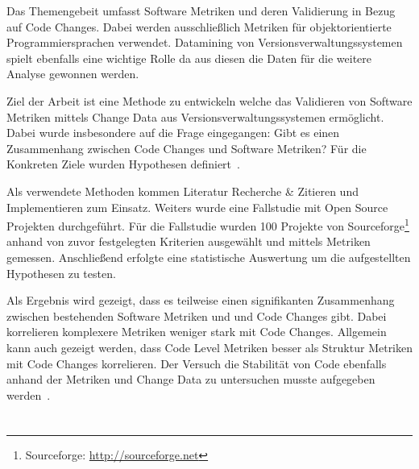 

 Das Themengebeit umfasst Software Metriken und deren
Validierung in Bezug auf Code Changes. Dabei werden ausschließlich Metriken
für objektorientierte Programmiersprachen verwendet. Datamining von
Versionsverwaltungssystemen spielt ebenfalls eine wichtige Rolle da aus diesen
die Daten für die weitere Analyse gewonnen werden.

 Ziel der Arbeit ist eine Methode zu entwickeln
welche das Validieren von Software Metriken mittels Change Data aus
Versionsverwaltungssystemen ermöglicht. Dabei wurde insbesondere auf die Frage
eingegangen: Gibt es einen Zusammenhang zwischen Code Changes und Software
Metriken? Für die Konkreten Ziele wurden Hypothesen
definiert~\cite[Kap.~6.2,~S.~39]{Mauczka2008}.

 Als verwendete Methoden kommen Literatur
Recherche \& Zitieren und Implementieren zum Einsatz. Weiters wurde eine
Fallstudie mit Open Source Projekten durchgeführt. Für die Fallstudie wurden
100 Projekte von Sourceforge\footnote{Sourceforge:
\url{http://sourceforge.net}} anhand von zuvor festgelegten Kriterien
ausgewählt und mittels Metriken gemessen. Anschließend erfolgte eine
statistische Auswertung um die aufgestellten Hypothesen zu testen.

 Als Ergebnis wird gezeigt, dass es teilweise einen
signifikanten Zusammenhang zwischen bestehenden Software Metriken und und Code
Changes gibt. Dabei korrelieren komplexere Metriken weniger stark mit Code
Changes. Allgemein kann auch gezeigt werden, dass Code Level Metriken besser
als Struktur Metriken mit Code Changes korrelieren. Der Versuch die Stabilität
von Code ebenfalls anhand der Metriken und Change Data zu untersuchen musste
aufgegeben werden~\cite[Kap.~8,~S.~83]{Mauczka2008}.


%
\section*{\thesisheading}








